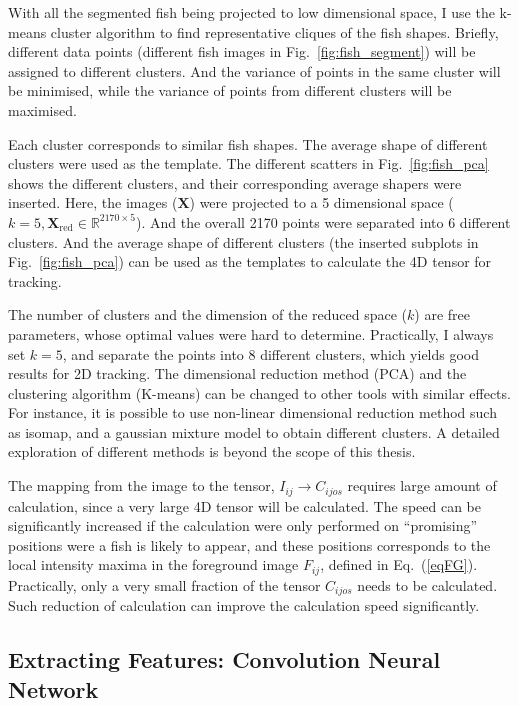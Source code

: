 \documentclass[11pt,twoside]{report}
\begin{document}
With all the segmented fish being projected to low dimensional space, I use the k-means cluster algorithm to find representative cliques of the fish shapes. Briefly, different data points (different fish images in Fig.~\ref{fig:fish_segment}) will be assigned to different clusters. And the variance of points in the same cluster will be minimised, while the variance of points from different clusters will be maximised.

Each cluster corresponds to similar fish shapes. The average shape of different clusters were used as the template. The different scatters in Fig.~\ref{fig:fish_pca} shows the different clusters, and their corresponding average shapers were inserted. Here, the images ($\mathbf{X}$) were projected to a 5 dimensional space ($k = 5, \mathbf{X}_\text{red} \in \mathbb{R}^{2170 \times 5}$). And the overall 2170 points were separated into 6 different clusters. And the average shape of different clusters (the inserted subplots in Fig.~\ref{fig:fish_pca}) can be used as the templates to calculate the 4D tensor for tracking.

The number of clusters and the dimension of the reduced space ($k$) are free parameters, whose optimal values were hard to determine. Practically, I always set $k=5$, and separate the points into 8 different clusters, which yields good results for 2D tracking. The dimensional reduction method (PCA) and the clustering algorithm (K-means) can be changed to other tools with similar effects. For instance, it is possible to use non-linear dimensional reduction method such as isomap, and a gaussian mixture model to obtain different clusters. A detailed exploration of different methods is beyond the scope of this thesis.

The mapping from the image to the tensor, $I_{ij} \rightarrow C_{ijos}$ requires large amount of calculation, since a very large 4D tensor will be calculated. The speed can be significantly increased if the calculation were only performed on ``promising'' positions were a fish is likely to appear, and these positions corresponds to the local intensity maxima in the foreground image $F_{ij}$, defined in Eq.~(\ref{eqFG}). Practically, only a very small fraction of the tensor $C_{ijos}$ needs to be calculated. Such reduction of calculation can improve the calculation speed significantly.


\subsection{Extracting Features: Convolution Neural Network}
\label{section:cnn}
\end{document}
